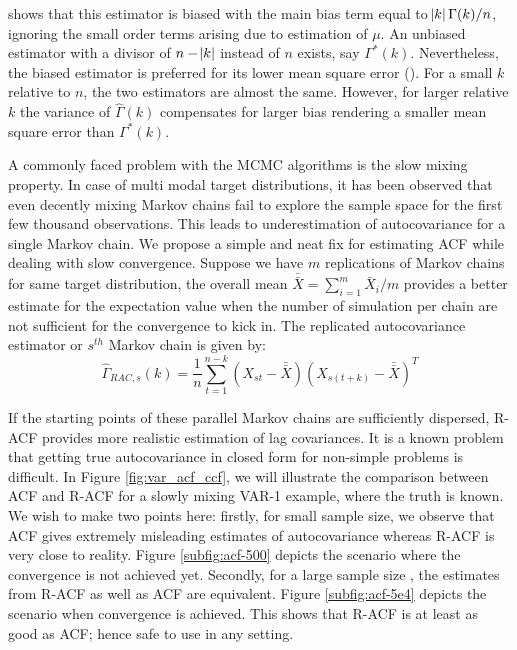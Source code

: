 \documentclass[12pt]{article}
\theoremstyle{remark}
\begin{document}
\cite{priestley1981spectral} shows that this estimator is biased with the main bias term equal to $\abs{k}\Gamma(k)/n$, ignoring the small order terms arising due to estimation of $\mu$. An unbiased estimator with a divisor of $n - \abs{k}$ instead of $n$ exists, say $\Gamma^*(k)$. Nevertheless, the biased estimator is preferred for its lower mean square error (\cite{priestley1981spectral}). For a small $k$ relative to $n$, the two estimators are almost the same. However, for larger relative $k$ the variance of $\hat{\Gamma}(k)$ compensates for larger bias rendering a smaller mean square error than $\Gamma^*(k)$. 

A commonly faced problem with the MCMC algorithms is the slow mixing property. In case of multi modal target distributions, it has been observed that even decently mixing Markov chains fail to explore the sample space for the first few thousand observations. This leads to underestimation of autocovariance for a single Markov chain. We propose a simple and neat fix for estimating ACF while dealing with slow convergence. Suppose we have $m$ replications of Markov chains for same target distribution, the overall mean $\bar{\bar{X}} = \sum_{i = 1}^{m}\bar{X}_i/m$ provides a better estimate for the expectation value when the number of simulation per chain are not sufficient for the convergence to kick in. The replicated autocovariance estimator or $s^{th}$ Markov chain is given by:
%
\[
\hat{\Gamma}_{RAC,s}(k) = \dfrac{1}{n}\sum_{t=1}^{n-k}(X_{st}-\bar{\bar{X}})(X_{s(t+k)}-\bar{\bar{X}})^T
\]

If the starting points of these parallel Markov chains are sufficiently dispersed, R-ACF provides more realistic estimation of lag covariances. It is a known problem that getting true autocovariance in closed form for non-simple problems is difficult. In Figure \ref{fig:var_acf_ccf}, we will illustrate the comparison between ACF and R-ACF for a slowly mixing VAR-1 example, where the truth is known. We wish to make two points here: firstly, for small sample size, we observe that ACF gives extremely misleading estimates of autocovariance whereas R-ACF is very close to reality. Figure \ref{subfig:acf-500} depicts the scenario where the convergence is not achieved yet. Secondly, for a large sample size , the estimates from R-ACF as well as ACF are equivalent. Figure \ref{subfig:acf-5e4} depicts the scenario when convergence is achieved. This shows that R-ACF is at least as good as ACF; hence safe to use in any setting.
\end{document}
